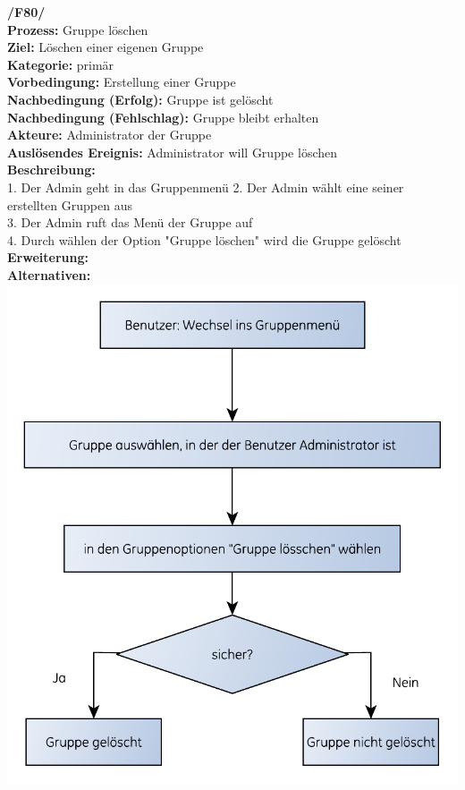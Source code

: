 \textbf{/F80/} \\
\textbf{Prozess:} Gruppe löschen \\
\textbf{Ziel:} Löschen einer eigenen Gruppe \\
\textbf{Kategorie:} primär \\
\textbf{Vorbedingung:} Erstellung einer Gruppe \\
\textbf{Nachbedingung (Erfolg):} Gruppe ist gelöscht\\
\textbf{Nachbedingung (Fehlschlag):} Gruppe bleibt erhalten\\
\textbf{Akteure:} Administrator der Gruppe \\
\textbf{Auslösendes Ereignis:} Administrator will Gruppe löschen\\
\textbf{Beschreibung:} \\
1. Der Admin geht in das Gruppenmenü
2. Der Admin wählt eine seiner erstellten Gruppen aus \\
3. Der Admin ruft das Menü der Gruppe auf \\
4. Durch wählen der Option "Gruppe löschen" wird die Gruppe gelöscht \\
\textbf{Erweiterung:} \\
\textbf{Alternativen:} \\

\includegraphics[scale=0.8]{./res/F80_gruppe_loeschen_flowgraph.pdf}
